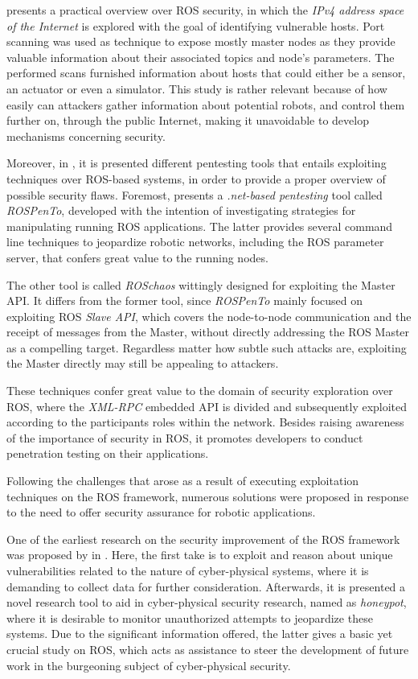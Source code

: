 \citeauthor*{8794451} presents a practical overview over ROS security, in which the \textit{IPv4 address space of the Internet} is explored with the goal of identifying vulnerable hosts. Port scanning was used as technique to expose mostly master nodes as they provide valuable information about their associated topics and node's parameters. The performed scans furnished information about hosts that could either be a sensor, an actuator or even a simulator. This study is rather relevant because of how easily can attackers gather information about potential robots, and control them further on, through the public Internet, making it unavoidable to develop mechanisms concerning security. 

Moreover, in , it is presented different pentesting tools that entails exploiting techniques over ROS-based systems, in order to provide a proper overview of possible security flaws. Foremost, \citeauthor{dieber2020penetration} presents a \textit{.net-based pentesting} tool called \textit{ROSPenTo}, developed with the intention of investigating strategies for manipulating running ROS applications. The latter provides several command line techniques to jeopardize robotic networks, including the ROS parameter server, that confers great value to the running nodes. 

The other tool is called \textit{ROSchaos} wittingly designed for exploiting the Master API. It differs from the former tool, since \textit{ROSPenTo} mainly focused on exploiting ROS \textit{Slave API}, which covers the node-to-node communication and the receipt of messages from the Master, without directly addressing the ROS Master as a compelling target. Regardless matter how subtle such attacks are, exploiting the Master directly may still be appealing to attackers. 

These techniques confer great value to the domain of security exploration over ROS, where the \textit{XML-RPC} embedded API is divided and subsequently exploited according to the participants roles within the network. Besides raising awareness of the importance of security in ROS, it promotes developers to conduct penetration testing on their applications.

Following the challenges that arose as a result of executing exploitation techniques on the ROS framework, numerous solutions were proposed in response to the need to offer security assurance for robotic applications. 

One of the earliest research on the security improvement of the ROS framework was proposed by \citeauthor{mcclean2013preliminary} in . Here, the first take is to exploit and reason about unique vulnerabilities related to the nature of cyber-physical systems, where it is demanding to collect data for further consideration. Afterwards, it is presented a novel research tool to aid in cyber-physical security research, named as \textit{honeypot}, where it is desirable to monitor unauthorized attempts to jeopardize these systems. Due to the significant information offered, the latter gives a basic yet crucial study on ROS, which acts as assistance to steer the development of future work in the burgeoning subject of cyber-physical security. 

